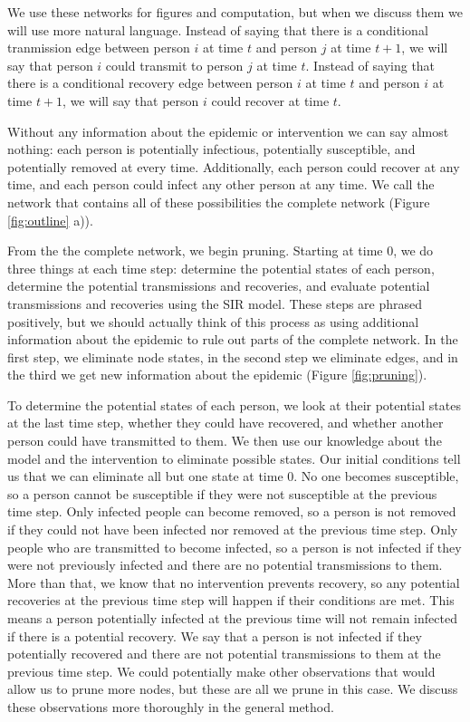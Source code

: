\documentclass[PTRSB]{rsos}
\begin{document}
\begin{multicols}{2}
We use these networks for figures and computation, but when we discuss them we will use more natural language.
Instead of saying that there is a conditional tranmission edge between person $i$ at time $t$ and person $j$ at time $t+1$, we will say that person $i$ could transmit to person $j$ at time $t$.
Instead of saying that there is a conditional recovery edge between person $i$ at time $t$ and person $i$ at time $t+1$, we will say that person $i$ could recover at time $t$.

Without any information about the epidemic or intervention we can say almost nothing: each person is potentially infectious, potentially susceptible, and potentially removed at every time.
Additionally, each person could recover at any time, and each person could infect any other person at any time.
We call the network that contains all of these possibilities the complete network (Figure \ref{fig:outline} a)).

From the the complete network, we begin pruning.
Starting at time $0$, we do three things at each time step: determine the potential states of each person, determine the potential transmissions and recoveries, and evaluate potential transmissions and recoveries using the SIR model.
These steps are phrased positively, but we should actually think of this process as using additional information about the epidemic to rule out parts of the complete network.
In the first step, we eliminate node states, in the second step we eliminate edges, and in the third we get new information about the epidemic (Figure \ref{fig:pruning}).

To determine the potential states of each person, we look at their potential states at the last time step, whether they could have recovered, and whether another person could have transmitted to them.
We then use our knowledge about the model and the intervention to eliminate possible states.
Our initial conditions tell us that we can eliminate all but one state at time $0$.
No one becomes susceptible, so a person cannot be susceptible if they were not susceptible at the previous time step.
Only infected people can become removed, so a person is not removed if they could not have been infected nor removed at the previous time step.
Only people who are transmitted to become infected, so a person is not infected if they were not previously infected and there are no potential transmissions to them.
More than that, we know that no intervention prevents recovery, so any potential recoveries at the previous time step will happen if their conditions are met.
This means a person potentially infected at the previous time will not remain infected if there is a potential recovery.
We say that a person is not infected if they potentially recovered and there are not potential transmissions to them at the previous time step.
We could potentially make other observations that would allow us to prune more nodes, but these are all we prune in this case.
We discuss these observations more thoroughly in the general method.


\end{multicols}
\end{document}
